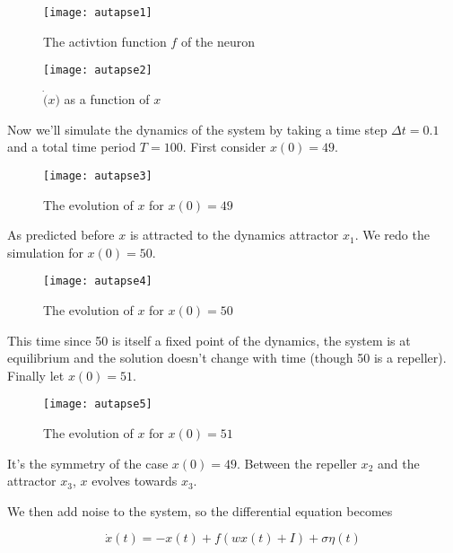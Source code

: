 \newpage

\vspace{-1em}
\begin{figure}[H]
  \centering
  \texttt{[image: autapse1]}
  \caption{The activtion function $f$ of the neuron}
  \label{fig: activate}
\end{figure}

\vspace{-1em}
\begin{figure}[H]
  \centering
  \texttt{[image: autapse2]}
  \caption{$\dot(x)$ as a function of $x$}
  \label{fig: x_derivative}
\end{figure}

Now we'll simulate the dynamics of the system by taking a time step 
$\Delta t = 0.1$ and a total time period $T = 100$. First consider
$x(0) = 49$.

\vspace{-1em}
\begin{figure}[H]
  \centering
  \texttt{[image: autapse3]}
  \caption{The evolution of $x$ for $x(0) = 49$}
\end{figure}

\noindent
As predicted before $x$ is attracted to the dynamics attractor $x_1$.
We redo the simulation for $x(0) = 50$.

\vspace{-1em}
\begin{figure}[H]
  \centering
  \texttt{[image: autapse4]}
  \caption{The evolution of $x$ for $x(0) = 50$}
\end{figure}

\noindent
This time since 50 is itself a fixed point of the dynamics, the system 
is at equilibrium and the solution doesn't change with time (though 50
is a repeller). Finally let $x(0) = 51$.

\vspace{-1em}
\begin{figure}[H]
  \centering
  \texttt{[image: autapse5]}
  \caption{The evolution of $x$ for $x(0) = 51$}
\end{figure}

\noindent
It's the symmetry of the case $x(0) = 49$. Between the repeller $x_2$ and
the attractor $x_3$, $x$ evolves towards $x_3$.

We then add noise to the system, so the differential equation becomes

\[\dot{x}(t) = -x(t) + f(wx(t)+I) + \sigma\eta(t)\]

